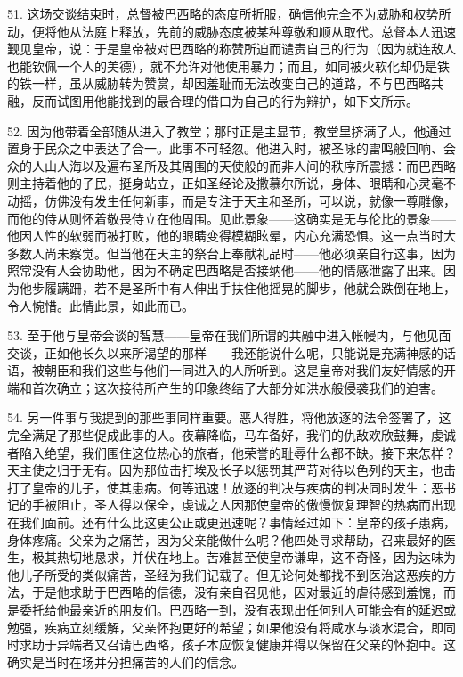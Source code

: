 51. 这场交谈结束时，总督被巴西略的态度所折服，确信他完全不为威胁和权势所动，便将他从法庭上释放，先前的威胁态度被某种尊敬和顺从取代。总督本人迅速觐见皇帝，说：于是皇帝被对巴西略的称赞所迫而谴责自己的行为（因为就连敌人也能钦佩一个人的美德），就不允许对他使用暴力；而且，如同被火软化却仍是铁的铁一样，虽从威胁转为赞赏，却因羞耻而无法改变自己的道路，不与巴西略共融，反而试图用他能找到的最合理的借口为自己的行为辩护，如下文所示。\par

52. 因为他带着全部随从进入了教堂；那时正是主显节，教堂里挤满了人，他通过置身于民众之中表达了合一。此事不可轻忽。他进入时，被圣咏的雷鸣般回响、会众的人山人海以及遍布圣所及其周围的天使般的而非人间的秩序所震撼：而巴西略则主持着他的子民，挺身站立，正如圣经论及撒慕尔所说，身体、眼睛和心灵毫不动摇，仿佛没有发生任何新事，而是专注于天主和圣所，可以说，就像一尊雕像，而他的侍从则怀着敬畏侍立在他周围。见此景象——这确实是无与伦比的景象——他因人性的软弱而被打败，他的眼睛变得模糊眩晕，内心充满恐惧。这一点当时大多数人尚未察觉。但当他在天主的祭台上奉献礼品时——他必须亲自行这事，因为照常没有人会协助他，因为不确定巴西略是否接纳他——他的情感泄露了出来。因为他步履蹒跚，若不是圣所中有人伸出手扶住他摇晃的脚步，他就会跌倒在地上，令人惋惜。此情此景，如此而已。\par

53. 至于他与皇帝会谈的智慧——皇帝在我们所谓的共融中进入帐幔内，与他见面交谈，正如他长久以来所渴望的那样——我还能说什么呢，只能说是充满神感的话语，被朝臣和我们这些与他们一同进入的人所听到。这是皇帝对我们友好情感的开端和首次确立；这次接待所产生的印象终结了大部分如洪水般侵袭我们的迫害。\par

54. 另一件事与我提到的那些事同样重要。恶人得胜，将他放逐的法令签署了，这完全满足了那些促成此事的人。夜幕降临，马车备好，我们的仇敌欢欣鼓舞，虔诚者陷入绝望，我们围住这位热心的旅者，他荣誉的耻辱什么都不缺。接下来怎样？天主使之归于无有。因为那位击打埃及长子以惩罚其严苛对待以色列的天主，也击打了皇帝的儿子，使其患病。何等迅速！放逐的判决与疾病的判决同时发生：恶书记的手被阻止，圣人得以保全，虔诚之人因那使皇帝的傲慢恢复理智的热病而出现在我们面前。还有什么比这更公正或更迅速呢？事情经过如下：皇帝的孩子患病，身体疼痛。父亲为之痛苦，因为父亲能做什么呢？他四处寻求帮助，召来最好的医生，极其热切地恳求，并伏在地上。苦难甚至使皇帝谦卑，这不奇怪，因为达味为他儿子所受的类似痛苦，圣经为我们记载了。但无论何处都找不到医治这恶疾的方法，于是他求助于巴西略的信德，没有亲自召见他，因对最近的虐待感到羞愧，而是委托给他最亲近的朋友们。巴西略一到，没有表现出任何别人可能会有的延迟或勉强，疾病立刻缓解，父亲怀抱更好的希望；如果他没有将咸水与淡水混合，即同时求助于异端者又召请巴西略，孩子本应恢复健康并得以保留在父亲的怀抱中。这确实是当时在场并分担痛苦的人们的信念。\par

